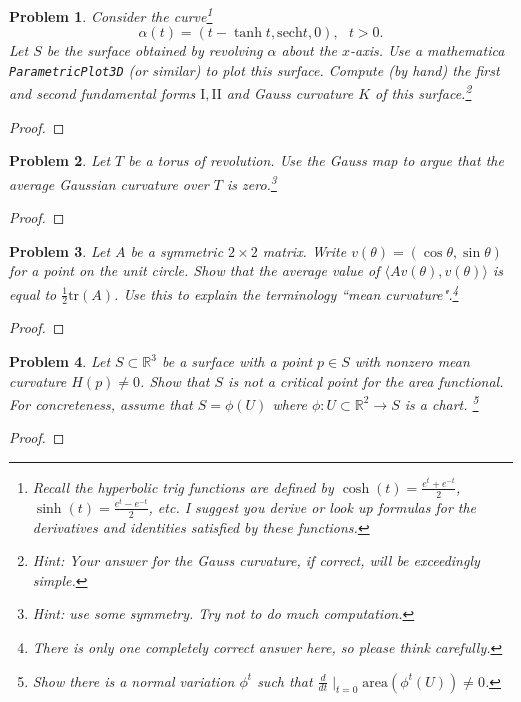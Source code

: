 \documentclass[11pt]{article}
\newtheorem{problem}{Problem}
\begin{document}
\pagebreak 

\begin{problem}
Consider the curve\footnote{Recall the hyperbolic trig functions are defined by $\cosh(t)=\frac{e^t+e^{-t}}{2}$, $\sinh(t)=\frac{e^t-e^{-t}}{2}$, etc. I suggest you derive or look up formulas for the derivatives and identities satisfied by these functions.}
\[\alpha(t)=(t-\tanh t,\text{sech} t,0),\>\>\>t>0.\]
Let $S$ be the surface obtained by revolving $\alpha$ about the $x$-axis. Use a mathematica \texttt{ParametricPlot3D} (or similar) to plot this surface. Compute (by hand) the first and second fundamental forms $\mathrm I,\mathrm{I\!I}$ and Gauss curvature $K$ of this surface.\footnote{Hint: Your answer for the Gauss curvature, if correct, will be exceedingly simple.} 
\end{problem}

\begin{proof}

\end{proof}

\pagebreak 

\begin{problem}
Let $T$ be a torus of revolution. Use the Gauss map to argue that the average Gaussian curvature over $T$ is zero.\footnote{Hint: use some symmetry. Try not to do much computation.} 
\end{problem}

\begin{proof}

\end{proof}

\pagebreak 

\begin{problem}
Let $A$ be a symmetric $2\times 2$ matrix. Write $v(\theta)=(\cos \theta,\sin\theta)$ for a point on the unit circle. Show that the average value of $\langle Av(\theta),v(\theta)\rangle$ is equal to $\frac{1}{2}\mathrm{tr}(A)$. Use this to explain the terminology ``mean curvature".\footnote{There is only one completely correct answer here, so please think carefully.} 
\end{problem}

\begin{proof}

\end{proof}

\pagebreak 

\begin{problem}
Let $S\subset\mathbb R^3$ be a surface with a point $p\in S$ with nonzero mean curvature $H(p)\neq0$. Show that $S$ is not a critical point for the area functional. For concreteness, assume that $S=\phi(U)$ where $\phi:U\subset\mathbb R^2\to S$ is a chart. \footnote{Show there is a normal variation $\phi^t$ such that $\frac{d}{dt}\mid_{t=0} \mathrm{area}(\phi^t(U))\neq0$.}
\end{problem}

\begin{proof}

\end{proof}
\end{document}
